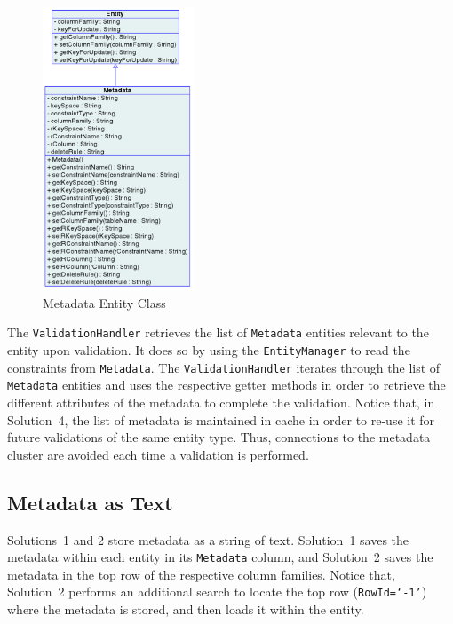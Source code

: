 	\begin{figure}[h] 
		\centering		
		\includegraphics[width=0.4\textwidth]{./figure/Solutions/FinalMetadata.png}
		\caption{Metadata Entity Class}\label{fi:MetadataEntityClass}
	\end{figure}
	
The \texttt{ValidationHandler} retrieves the list of \texttt{Metadata} entities
relevant to the entity upon validation.  It does so by using the
\texttt{EntityManager} to read the constraints from \texttt{Metadata}.  The
\texttt{ValidationHandler} iterates through the list of 
\texttt{Metadata} entities and uses the respective getter methods in order to
retrieve the different attributes of the metadata to complete the validation. 
Notice that, in Solution~4, the list of metadata is maintained in
cache in order to re-use it for future validations of the same entity type.
Thus,  connections to the metadata cluster are avoided each time a validation
is performed.


\subsection{Metadata as Text}\label{ss:implementation-MDText}

Solutions~1 and 2 store metadata as a string of text. Solution~1 saves the
metadata within each entity in its  \texttt{Metadata} column, and
 Solution~2 saves the metadata in  the top row of the respective column
families. Notice that, Solution~2 performs an additional
 search to locate the  top row (\texttt{RowId=`-1'}) where the metadata is
 stored, and then loads it within the  entity.
 
